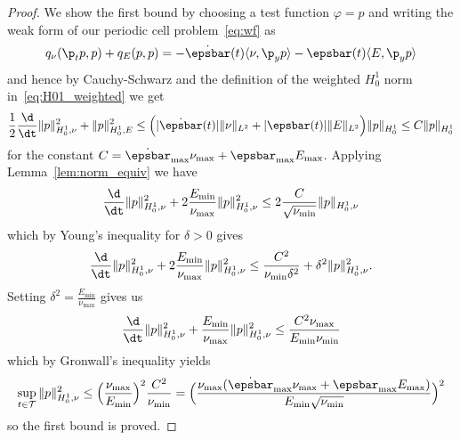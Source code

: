 \documentclass[letterpaper,11pt]{article}
\begin{document}
\begin{proof}
    We show the first bound by choosing a test function $\varphi = p$ and writing the weak form of our periodic cell problem~\eqref{eq:wf} as
    \begin{equation}
        q_\nu(\p_t p, p) + q_E(p, p) = -\dot{\epsbar}(t)\langle\nu, \p_y p\rangle - \epsbar(t)\langle E, \p_y p\rangle
    \end{equation}
    and hence by Cauchy-Schwarz and the definition of the weighted $H^1_0$ norm in~\eqref{eq:H01_weighted} we get
    \begin{align*}
        \frac{1}{2}\frac{\d}{\dt}\|p\|_{H_0^1, \nu}^2 + \|p\|_{H_0^1, E}^2 \leq \Big(|\dot{\epsbar}(t)|\|\nu\|_{L^2} + |\epsbar(t)|\|E\|_{L^2}\Big)\|p\|_{H_0^1} \leq C\|p\|_{H_0^1}
    \end{align*}
    for the constant $C = \dot{\epsbar}_{\max}\nu_{\max} + \epsbar_{\max}E_{\max}$. Applying Lemma~\ref{lem:norm_equiv} we have
    \begin{align*}
        \frac{\d}{\dt}\|p\|_{H_0^1, \nu}^2 + 2\frac{E_{\min}}{\nu_{\max}}\|p\|_{H_0^1, \nu}^2 \leq 2\frac{C}{\sqrt{\nu_{\min}}}\|p\|_{H_0^1, \nu}
    \end{align*}
    which by Young's inequality for $\delta > 0$ gives
    \begin{align*}
        \frac{\d}{\dt}\|p\|_{H_0^1, \nu}^2 + 2\frac{E_{\min}}{\nu_{\max}}\|p\|_{H_0^1, \nu}^2 \leq \frac{C^2}{\nu_{\min}\delta^2} + \delta^2\|p\|_{H_0^1, \nu}^2.
    \end{align*}
    Setting $\delta^2 = \frac{E_{\min}}{\nu_{\max}}$ gives us
    \begin{align*}
        \frac{\d}{\dt}\|p\|_{H_0^1, \nu}^2 + \frac{E_{\min}}{\nu_{\max}}\|p\|_{H_0^1, \nu}^2 \leq \frac{C^2\nu_{\max}}{E_{\min}\nu_{\min}}
    \end{align*}
    which by Gronwall's inequality yields
    \begin{equation}\label{eq:p_bound}
        \sup_{t \in \mathcal{T}}\|p\|_{H_0^1, \nu}^2 \leq \Big(\frac{\nu_{\max}}{E_{\min}}\Big)^2\frac{C^2}{\nu_{\min}} = \Big(\frac{\nu_{\max}(\dot{\epsbar}_{\max}\nu_{\max} + \epsbar_{\max}E_{\max})}{E_{\min}\sqrt{\nu_{\min}}}\Big)^2
    \end{equation}
    so the first bound is proved.


\end{proof}
\end{document}
